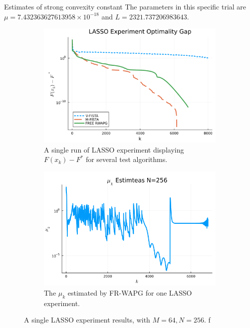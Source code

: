 \documentclass[11pt]{beamer}
\theoremstyle{definition}
\begin{document}
        \begin{frame}{Estimates of strong convexity constant}
            The parameters in this specific trial are $\mu = 7.432363627613958\times 10^{-18}$ and $L = 2321.737206983643$. 
            \begin{figure}[H]
                \begin{subfigure}[b]{0.47\textwidth}
                    \includegraphics[width=\textwidth]{assets/lasso_loss_256.png}
                    \caption
                    {A single run of LASSO experiment displaying $F(x_k) - F^*$ for several test algorithms.
                    }
                \end{subfigure}
                \hfill
                \begin{subfigure}[b]{0.47\textwidth}
                    \includegraphics[width=\textwidth]{assets/lasso_sc_estimates_256.png}
                    \caption{The $\mu_k$ estimated by FR-WAPG for one LASSO experiment. }
                \end{subfigure}
                \caption{A single LASSO experiment results, with $M = 64, N=256$. f}
                \label{fig:single-lass-mu-estimates}
            \end{figure}
        \end{frame}
\end{document}
